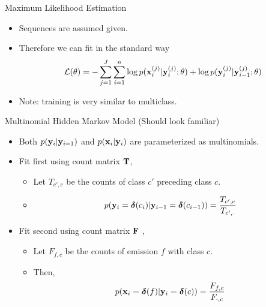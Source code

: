 \documentclass{beamer}
\begin{document}
\begin{frame}{Maximum Likelihood Estimation}
  \begin{itemize}
  \item Sequences are assumed given. 

    \air 
  \item Therefore we can fit in the standard way 
  \[ \mathcal{L}(\theta) =  - \sum_{ j=1}^J \sum_{i=1}^n \log p(\mathbf{x}^{(j)}_i | \mathbf{y}^{(j)}_i; \theta) + \log p(\mathbf{y}^{(j)}_i | \mathbf{y}^{(j)}_{i-1}; \theta) \] 
  \air 

\item Note: training is very similar to multiclass.
  
  \end{itemize}

\end{frame}

\begin{frame}{Multinomial Hidden Markov Model}
  (Should look familiar)
  \begin{itemize}
  \item  Both  $p(\mathbf{y}_i | \mathbf{y}_{i=1})$ and $p(\mathbf{x}_i | \mathbf{y}_i)$ are
    parameterized as multinomials.
    
  \item Fit first using count matrix $\mathbf{T}$,
    \begin{itemize}
      \item Let $T_{c',c}$ be the counts of class $c'$ preceding class $c$.

      \item \[p(\mathbf{y}_i = \boldsymbol{\delta}(c_i) | \mathbf{y}_{i-1} = \boldsymbol{\delta}(c_{i-1})) = \frac{T_{c', c}}{T_{c',\cdot}} \]
    \end{itemize}
    \pause

  \item Fit second using count matrix $\mathbf{F}$ ,
    \begin{itemize}
      \item Let $F_{f,c}$ be the counts of emission $f$ with class $c$.
      \item Then,
      \[p(\mathbf{x}_i=\boldsymbol{\delta}(f) | \mathbf{y}_i=\boldsymbol{\delta}(c)) = \frac{F_{f, c}}{F_{\cdot,c}}  \]     
    \end{itemize}
  \end{itemize}
\end{frame}
\end{document}
